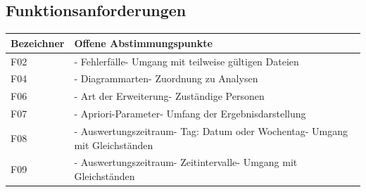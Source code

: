 \documentclass[a4paper,10pt]{article}
\begin{document}
        \subsection*{Funktionsanforderungen}
        \begin{longtable}{>{\raggedright\arraybackslash}p{}>{\raggedright\arraybackslash}p{}}
            \toprule
            \textbf{Bezeichner} & \textbf{Offene Abstimmungspunkte}                                                                                                                                          \\
            \midrule\endhead
            \bottomrule\endfoot
            F02                 & - Fehlerfälle\newline - Umgang mit teilweise gültigen Dateien                                                                                                              \\
            \midrule
            F04                 & - Diagrammarten\newline - Zuordnung zu Analysen                                                                                                                            \\
            \midrule
            F06                 & - Art der Erweiterung\newline - Zuständige Personen                                                                                                                        \\
            \midrule
            F07                 & - Apriori-Parameter\newline - Umfang der Ergebnisdarstellung                                                                                                               \\
            \midrule
            F08                 & - Auswertungszeitraum\newline - Tag: Datum oder Wochentag\newline - Umgang mit Gleichständen                                                                               \\
            \midrule
            F09                 & - Auswertungszeitraum\newline - Zeitintervalle\newline - Umgang mit Gleichständen                                                                                          \\

\end{longtable}
\end{document}
